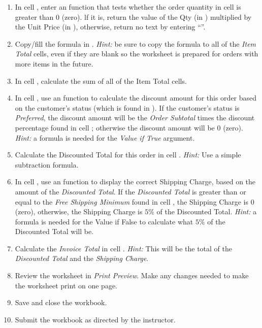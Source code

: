 \begin{enumerate}
\item In cell , enter an  function that tests whether the order quantity in cell  is greater than $ 0 $ (zero). lf it is, return the value of the Qty (in ) multiplied by the Unit Price (in ), otherwise, return no text by entering ``''.
\item Copy/fill the formula in  . \textit{Hint:} be sure to copy the formula to all of the \textit{Item Total} cells, even if they are blank so the worksheet is prepared for orders with more items in the future.
\item In cell , calculate the sum of all of the Item Total cells.
\item In cell , use an  function to calculate the discount amount for this order based on the customer's status (which is found in ). If the customer's status is \textit{Preferred}, the discount amount will be the \textit{Order Subtotal} times the discount percentage found in cell ; otherwise the discount amount will be $ 0 $ (zero). \textit{Hint:} a formula is needed for the \textit{Value if True} argument.
\item Calculate the Discounted Total for this order in cell . \textit{Hint:} Use a simple subtraction formula.
\item In cell , use an  function to display the correct Shipping Charge, based on the amount of the \textit{Discounted Total}. If the \textit{Discounted Total} is greater than or equal to the \textit{Free Shipping Minimum} found in cell , the Shipping Charge is $ 0 $ (zero), otherwise, the Shipping Charge is $ 5\% $ of the Discounted Total. \textit{Hint:} a formula is needed for the Value if False to calculate what $ 5\% $ of the Discounted Total will be.
\item Calculate the \textit{Invoice Total} in cell . \textit{Hint:} This will be the total of the \textit{Discounted Total} and the \textit{Shipping Charge}.
\item Review the worksheet in \textit{Print Preview}. Make any changes needed to make the worksheet print on one page.
\item Save and close the  workbook.
\item Submit the  workbook as directed by the instructor.
\end{enumerate}
